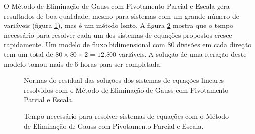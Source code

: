 \documentclass[final,5p]{elsarticle}
\numberwithin{equation}{section}
\begin{document}
        O Método de Eliminação de Gauss com Pivotamento Parcial e Escala gera resultados de boa qualidade, mesmo para sistemas com um grande número de variáveis (figura \ref{fig:errodois}), mas é um método lento. A figura \ref{fig:tempo} mostra que o tempo necessário para resolver cada um dos sistemas de equações propostos cresce rapidamente. Um modelo de fluxo bidimensional com 80 divisões em cada direção tem um total de $80 \times 80 \times 2 = 12.800$ variáveis. A solução de uma iteração deste modelo tomou mais de 6 horas para ser completada.

        \begin{figure}[hbt!]
            \caption{Normas do residual das soluções dos sistemas de equações lineares resolvidos com o Método de Eliminação de Gauss com Pivotamento Parcial e Escala.}
            \label{fig:errodois}
        \end{figure}

        \begin{figure}[hbt!]
            \caption{Tempo necessário para resolver sistemas de equações com o Método de Eliminação de Gauss com Pivotamento Parcial e Escala.}
            \label{fig:tempo}
        \end{figure}
\end{document}
